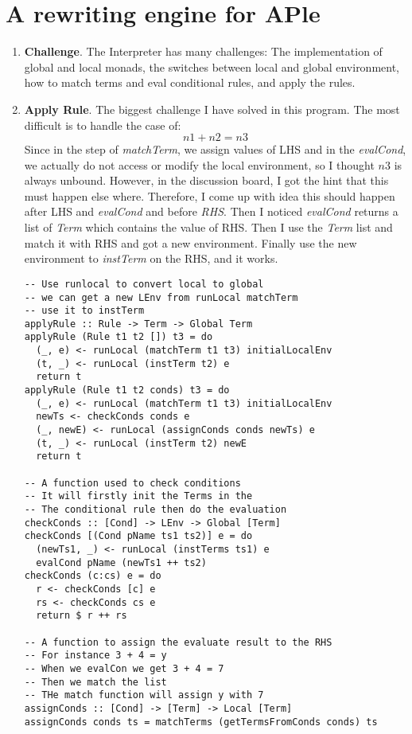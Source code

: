 \documentclass[11pt]{article}
\begin{document}
\section{A rewriting engine for APle}

\begin{enumerate}
\item \textbf{Challenge}. The Interpreter has many challenges: The implementation of global and local monads, the switches between local and global environment, how to match terms and eval conditional rules, and apply the rules. 

\item \textbf{Apply Rule}. The biggest challenge I have solved in this program. The most difficult is to handle the case of:
$$n1 + n2 = n3$$
Since in the step of \textit{matchTerm}, we assign values of LHS and in the \textit{evalCond}, we actually do not access or modify the local environment, so I thought $n3$ is always unbound. However, in the discussion board, I got the hint that this must happen else where. Therefore, I come up with idea this should happen after LHS and \textit{evalCond} and before \textit{RHS}. Then I noticed \textit{evalCond} returns a list of \textit{Term} which contains the value of RHS. Then I use the \textit{Term} list and match it with RHS and got a new environment. Finally use the new environment to \textit{instTerm} on the RHS, and it works.

\begin{lstlisting}
-- Use runlocal to convert local to global
-- we can get a new LEnv from runLocal matchTerm
-- use it to instTerm
applyRule :: Rule -> Term -> Global Term
applyRule (Rule t1 t2 []) t3 = do
  (_, e) <- runLocal (matchTerm t1 t3) initialLocalEnv
  (t, _) <- runLocal (instTerm t2) e
  return t
applyRule (Rule t1 t2 conds) t3 = do
  (_, e) <- runLocal (matchTerm t1 t3) initialLocalEnv
  newTs <- checkConds conds e
  (_, newE) <- runLocal (assignConds conds newTs) e
  (t, _) <- runLocal (instTerm t2) newE
  return t

-- A function used to check conditions
-- It will firstly init the Terms in the
-- The conditional rule then do the evaluation
checkConds :: [Cond] -> LEnv -> Global [Term]
checkConds [(Cond pName ts1 ts2)] e = do
  (newTs1, _) <- runLocal (instTerms ts1) e
  evalCond pName (newTs1 ++ ts2)
checkConds (c:cs) e = do
  r <- checkConds [c] e
  rs <- checkConds cs e
  return $ r ++ rs

-- A function to assign the evaluate result to the RHS
-- For instance 3 + 4 = y
-- When we evalCon we get 3 + 4 = 7
-- Then we match the list 
-- THe match function will assign y with 7
assignConds :: [Cond] -> [Term] -> Local [Term]
assignConds conds ts = matchTerms (getTermsFromConds conds) ts


\end{lstlisting}
\end{enumerate}
\end{document}
